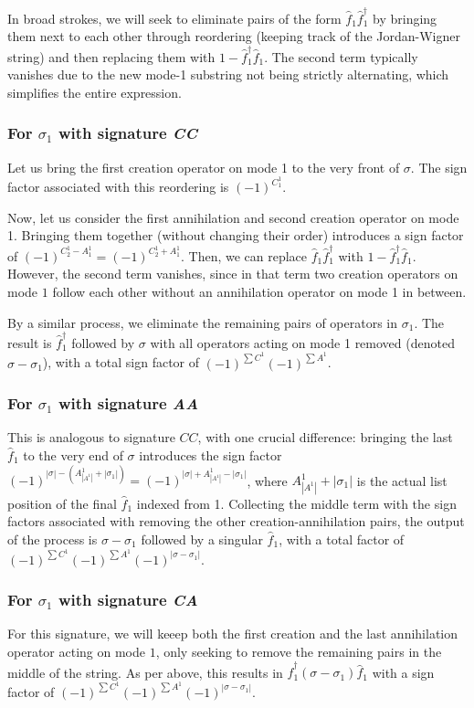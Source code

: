 \documentclass[12pt]{article}
\newcommand{\hc}{^\dagger}
\begin{document}
	In broad strokes, we will seek to eliminate pairs of the form $\hat{f}_1 \hat{f}_1\hc$ by bringing them next to each other through reordering (keeping track of the Jordan-Wigner string) and then replacing them with $1 - \hat{f}_1\hc \hat{f}_1$. The second term typically vanishes due to the new mode-1 substring not being strictly alternating, which simplifies the entire expression.
	
	\subsubsection{For $\sigma_1$ with signature \textit{CC}}
	Let us bring the first creation operator on mode 1 to the very front of $\sigma$. The sign factor associated with this reordering is $(-1)^{C^1_1}$.
	
	Now, let us consider the first annihilation and second creation operator on mode 1. Bringing them together (without changing their order) introduces a sign factor of $(-1)^{C^1_2 - A^1_1} = (-1)^{C^1_2 + A^1_1}$. Then, we can replace $\hat{f}_1 \hat{f}_1\hc$ with $1 - \hat{f}_1\hc \hat{f}_1$. However, the second term vanishes, since in that term two creation operators on mode $1$ follow each other without an annihilation operator on mode 1 in between.
	
	By a similar process, we eliminate the remaining pairs of operators in $\sigma_1$. The result is $\hat{f}_1\hc$ followed by $\sigma$ with all operators acting on mode 1 removed (denoted $\sigma - \sigma_1$), with a total sign factor of $(-1)^{\sum C^1}(-1)^{\sum A^1}$.
	
	\subsubsection{For $\sigma_1$ with signature \textit{AA}}
	This is analogous to signature $CC$, with one crucial difference: bringing the last $\hat{f}_1$ to the very end of $\sigma$ introduces the sign factor $(-1)^{|\sigma| - (A^1_{|A^1|} + |\sigma_1|)} = (-1)^{|\sigma| + A^1_{|A^1|} - |\sigma_1|}$, where $A^1_{|A^1|} + |\sigma_1|$ is the actual list position of the final $\hat{f}_1$ indexed from 1. Collecting the middle term with the sign factors associated with removing the other creation-annihilation pairs, the output of the process is $\sigma - \sigma_1$ followed by a singular $\hat{f}_1$, with a total factor of $(-1)^{\sum C^1}(-1)^{\sum A^1}(-1)^{|\sigma - \sigma_1|}$.
	
	\subsubsection{For $\sigma_1$ with signature \textit{CA}}
	For this signature, we will keeep both the first creation and the last annihilation operator acting on mode $1$, only seeking to remove the remaining pairs in the middle of the string. As per above, this results in $\hat{f}_1\hc (\sigma - \sigma_1) \hat{f}_1$ with a sign factor of $(-1)^{\sum C^1} (-1)^{\sum A^1} (-1)^{|\sigma - \sigma_1|}$.
	
\end{document}
